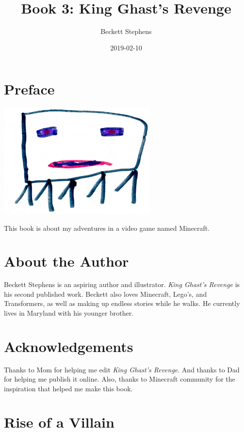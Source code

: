 \documentclass[12pt,oneside]{krantz}
\title{Book 3: King Ghast's Revenge}
\author{Beckett Stephens}
\date{2019-02-10}
\begin{document}
\maketitle

{
\setcounter{tocdepth}{1}
\tableofcontents
}
\hypertarget{preface}{%
\chapter*{Preface}\label{preface}}


\includegraphics[width=3.125in,height=\textheight]{img/00-ghast.jpg}

This book is about my adventures in a video game named Minecraft.

\hypertarget{about-the-author}{%
\chapter*{About the Author}\label{about-the-author}}


Beckett Stephens is an aspiring author and illustrator. \emph{King
Ghast's Revenge} is his second published work. Beckett also loves
Minecraft, Lego's, and Transformers, as well as making up endless
stories while he walks. He currently lives in Maryland with his younger
brother.

\hypertarget{acknowledgements}{%
\chapter*{Acknowledgements}\label{acknowledgements}}


Thanks to Mom for helping me edit \emph{King Ghast's Revenge}. And
thanks to Dad for helping me publish it online. Also, thanks to
Minecraft community for the inspiration that helped me make this book.

\hypertarget{rise-of-a-villain}{%
\chapter{Rise of a Villain}\label{rise-of-a-villain}}
\end{document}
